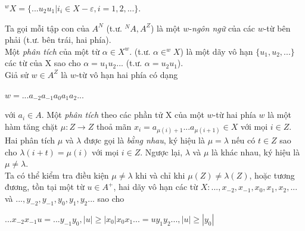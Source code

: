 $^wX = \{ ...u_2u_1 | i_i \in X - \varepsilon , i = 1,2,... \}$.
\begin{flushleft}
\hspace{10mm}Ta gọi mỗi tập con của $A^N$ (t.ư. $^NA, A^Z$) là một $w$-\textit{ngôn ngữ} của các $w$-từ bên phải (t.ư. bên trái, hai phía).\\
\hspace{10mm}Một \textit{phân tích} của một từ $\alpha \in X^w$. (t.ư. $\alpha \in ^wX$) là một dãy vô hạn $\{ u_1, u_2, ... \}$ các từ của X sao cho $\alpha = u_1u_2...$ (t.ư. $\alpha = u_2u_1$).\\
\hspace{10mm}Giả sử $w \in A^Z$ là $w$-từ vô hạn hai phía có dạng
\end{flushleft}
$w = ...a_{-2}a_{-1}a_0a_1a_2$...
\begin{flushleft}
với $a_i \in A$. Một \textit{phân tích} theo các phần tử X của một $w$-từ hai phía $w$ là một hàm tăng chặt $\mu : Z \to Z $ thoả mãn $x_i = a_{\mu(i)+1}$...$a_{\mu(i+1)} \in X$ với mọi $i \in Z$.\\
\hspace{10mm}Hai phân tích $\mu$ và $\lambda$ được gọi là \textit{bằng nhau}, ký hiệu là $\mu = \lambda$ nếu có $t \in Z$ sao cho $\lambda(i+t) = \mu(i)$ với mọi $i \in Z$. Ngược lại, $\lambda$ và $\mu$ là khác nhau, ký hiệu là $\mu \ne \lambda$. \\
Ta có thể kiểm tra điều kiện $\mu \ne \lambda$ khi và chỉ khi $\mu(Z) \ne \lambda(Z)$, hoặc tương đương, tồn tại một từ $u \in A^+$, hai dãy vô hạn các từ $X: ... , x_{-2}, x_{-1}, x_0, x_1, x_2, ...$ và $..., y_{-2}, y_{-1}, y_0, y_1, y_2$... sao cho 
\end{flushleft}
$...x_{-2}x_{-1}u = ...y_{-1}y_0, |u| \ge |x_0|
x_0x_1... = uy_1y_2... , |u| \ge |y_0|
$
